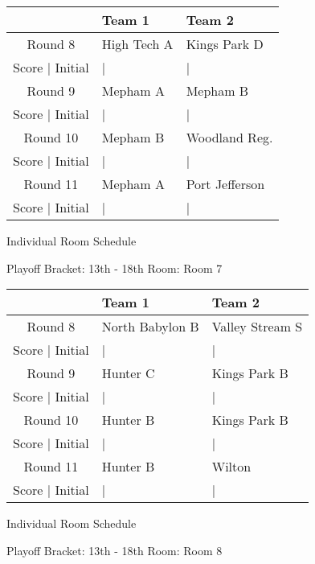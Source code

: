 \documentclass{article}%
\begin{document}
%
\begin{tabularx}{\textwidth}{|c|Y|Y|}%
\hline%
&Team 1&Team 2\\%
\hline%
Round 8&High Tech A&Kings Park D\\%
\hline%
Score | Initial&|&|\\%
\hline%
Round 9&Mepham A&Mepham B\\%
\hline%
Score | Initial&|&|\\%
\hline%
Round 10&Mepham B&Woodland Reg.\\%
\hline%
Score | Initial&|&|\\%
\hline%
Round 11&Mepham A&Port Jefferson\\%
\hline%
Score | Initial&|&|\\%
\hline%
\end{tabularx}%
\vspace*{16pt}%
\linebreak%
\newpage%
\begin{center}%
\begin{Huge}%
Individual Room Schedule%
\end{Huge}%
\vspace*{16pt}%
\linebreak%
\begin{Large}%
Playoff Bracket: 13th - 18th \hfill Room: Room 7%
\end{Large}%
\end{center}%
%
\begin{tabularx}{\textwidth}{|c|Y|Y|}%
\hline%
&Team 1&Team 2\\%
\hline%
Round 8&North Babylon B&Valley Stream S\\%
\hline%
Score | Initial&|&|\\%
\hline%
Round 9&Hunter C&Kings Park B\\%
\hline%
Score | Initial&|&|\\%
\hline%
Round 10&Hunter B&Kings Park B\\%
\hline%
Score | Initial&|&|\\%
\hline%
Round 11&Hunter B&Wilton\\%
\hline%
Score | Initial&|&|\\%
\hline%
\end{tabularx}%
\vspace*{16pt}%
\linebreak%
\newpage%
\begin{center}%
\begin{Huge}%
Individual Room Schedule%
\end{Huge}%
\vspace*{16pt}%
\linebreak%
\begin{Large}%
Playoff Bracket: 13th - 18th \hfill Room: Room 8%
\end{Large}%
\end{center}%
\end{document}
